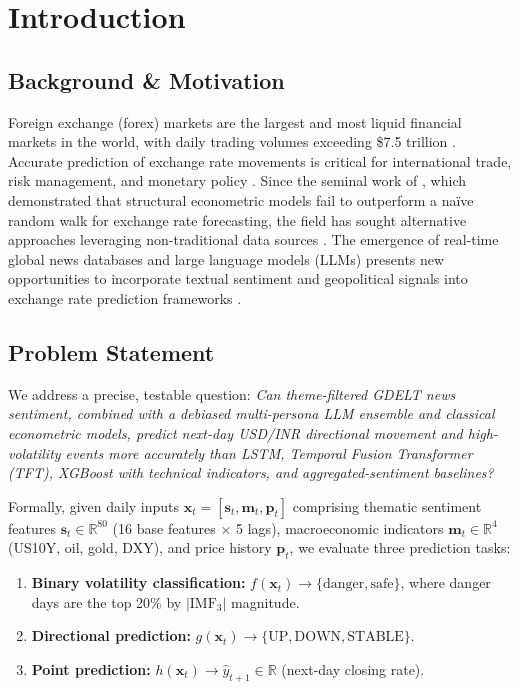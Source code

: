 \documentclass[11pt]{article}
\begin{document}
\section{Introduction}
\label{sec:intro}

\subsection{Background \& Motivation}

Foreign exchange (forex) markets are the largest and most liquid financial markets in the world, with daily trading volumes exceeding \$7.5 trillion \citep{bis2022}. Accurate prediction of exchange rate movements is critical for international trade, risk management, and monetary policy \citep{rossi2013}. Since the seminal work of \citet{meese1983}, which demonstrated that structural econometric models fail to outperform a na\"ive random walk for exchange rate forecasting, the field has sought alternative approaches leveraging non-traditional data sources \citep{engel2014}. The emergence of real-time global news databases and large language models (LLMs) presents new opportunities to incorporate textual sentiment and geopolitical signals into exchange rate prediction frameworks \citep{tetlock2007, bollen2011, sawhney2021}.

\subsection{Problem Statement}

We address a precise, testable question: \textit{Can theme-filtered GDELT news sentiment, combined with a debiased multi-persona LLM ensemble and classical econometric models, predict next-day USD/INR directional movement and high-volatility events more accurately than LSTM, Temporal Fusion Transformer (TFT), XGBoost with technical indicators, and aggregated-sentiment baselines?}

Formally, given daily inputs $\mathbf{x}_t = [\mathbf{s}_t, \mathbf{m}_t, \mathbf{p}_t]$ comprising thematic sentiment features $\mathbf{s}_t \in \mathbb{R}^{80}$ (16 base features $\times$ 5 lags), macroeconomic indicators $\mathbf{m}_t \in \mathbb{R}^{4}$ (US10Y, oil, gold, DXY), and price history $\mathbf{p}_t$, we evaluate three prediction tasks:
\begin{enumerate}[leftmargin=*]
    \item \textbf{Binary volatility classification:} $f(\mathbf{x}_t) \rightarrow \{\text{danger}, \text{safe}\}$, where danger days are the top 20\% by $|\text{IMF}_3|$ magnitude.
    \item \textbf{Directional prediction:} $g(\mathbf{x}_t) \rightarrow \{\text{UP}, \text{DOWN}, \text{STABLE}\}$.
    \item \textbf{Point prediction:} $h(\mathbf{x}_t) \rightarrow \hat{y}_{t+1} \in \mathbb{R}$ (next-day closing rate).
\end{enumerate}
\end{document}

